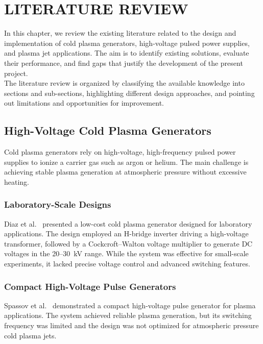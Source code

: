 \chapter{LITERATURE REVIEW}\label{chap-lit}
\thispagestyle{empty}

In this chapter, we review the existing literature related to the design and implementation of cold plasma generators, high-voltage pulsed power supplies, and plasma jet applications. The aim is to identify existing solutions, evaluate their performance, and find gaps that justify the development of the present project.\\
The literature review is organized by classifying the available knowledge into sections and sub-sections, highlighting different design approaches, and pointing out limitations and opportunities for improvement.

\section{High-Voltage Cold Plasma Generators}\label{sec-rev-topic1}

Cold plasma generators rely on high-voltage, high-frequency pulsed power supplies to ionize a carrier gas such as argon or helium. The main challenge is achieving stable plasma generation at atmospheric pressure without excessive heating.

\subsection{Laboratory-Scale Designs}\label{sec-rev-topic11}

Diaz et al.~\cite{Diaz2022} presented a low-cost cold plasma generator designed for laboratory applications. The design employed an H-bridge inverter driving a high-voltage transformer, followed by a Cockcroft--Walton voltage multiplier to generate DC voltages in the 20--30~kV range. While the system was effective for small-scale experiments, it lacked precise voltage control and advanced switching features.

\subsection{Compact High-Voltage Pulse Generators}\label{sec-rev-topic12}

Spassov et al.~\cite{Spassov1997} demonstrated a compact high-voltage pulse generator for plasma applications. The system achieved reliable plasma generation, but its switching frequency was limited and the design was not optimized for atmospheric pressure cold plasma jets.

